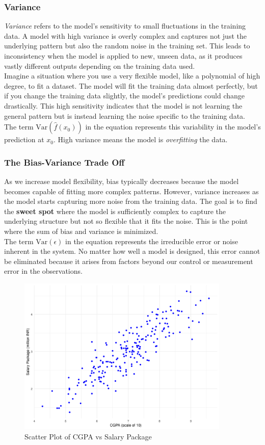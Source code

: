 \subsubsection{Variance}

\textit{Variance} refers to the model's sensitivity to small fluctuations in the training data. A model with high variance is overly complex and captures not just the underlying pattern but also the random noise in the training set. This leads to inconsistency when the model is applied to new, unseen data, as it produces vastly different outputs depending on the training data used.\\

Imagine a situation where you use a very flexible model, like a polynomial of high degree, to fit a dataset. The model will fit the training data almost perfectly, but if you change the training data slightly, the model's predictions could change drastically. This high sensitivity indicates that the model is not learning the general pattern but is instead learning the noise specific to the training data.\\

The term \( \text{Var}(\hat{f}(x_0)) \) in the equation represents this variability in the model's prediction at \( x_0 \). High variance means the model is \textit{overfitting} the data.

\subsubsection{The Bias-Variance Trade Off}

As we increase model flexibility, bias typically decreases because the model becomes capable of fitting more complex patterns. However, variance increases as the model starts capturing more noise from the training data. The goal is to find the \textbf{sweet spot} where the model is sufficiently complex to capture the underlying structure but not so flexible that it fits the noise. This is the point where the sum of bias and variance is minimized.\\

The term \( \text{Var}(\epsilon) \) in the equation represents the irreducible error or noise inherent in the system. No matter how well a model is designed, this error cannot be eliminated because it arises from factors beyond our control or measurement error in the observations.

\begin{figure}[h!]
    \centering
    \includegraphics[width=0.9\textwidth]{chapters/chapter1/plots/scatter_plot.png}
    \caption{Scatter Plot of CGPA vs Salary Package}
    \label{fig:scatter_plot}
\end{figure}